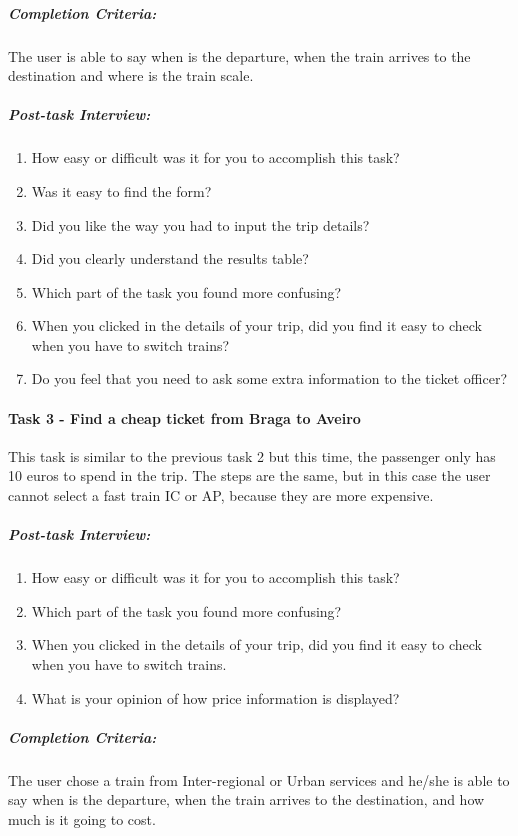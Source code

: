 \documentclass[a4paper]{article}
\begin{document}
\subparagraph{Completion Criteria:} The user is able to say when is the departure, when the train arrives to the destination and where is the train scale.

\subparagraph{Post-task Interview:}

\begin{enumerate}[label=2.\theenumi .]
  \item How easy or difficult was it for you to accomplish this task?
  \item Was it easy to find the form?
  \item Did you like the way you had to input the trip details?
  \item Did you clearly understand the results table?
  \item Which part of the task you found more confusing?
  \item When you clicked in the details of your trip, did you find it easy to check when you have to switch trains?
   \item Do you feel that you need to ask some extra information to the ticket officer?
\end{enumerate}


\paragraph{Task 3 - Find a cheap ticket from Braga to Aveiro}
This task is similar to the previous task 2 but this time, the passenger only has 10 euros to spend in the trip. The steps are the same, but in this case the user cannot select a fast train IC or AP, because they are more expensive.

\subparagraph{Post-task Interview:}

\begin{enumerate}[label=3.\theenumi .]
  \item How easy or difficult was it for you to accomplish this task?
  \item Which part of the task you found more confusing?
  \item When you clicked in the details of your trip, did you find it easy to check when you have to switch trains.
  \item What is your opinion of how price information is displayed?
\end{enumerate}

\subparagraph{Completion Criteria:} The user chose a train from Inter-regional or Urban services and he/she is able to say when is the departure, when the train arrives to the destination, and how much is it going to cost.
\end{document}
